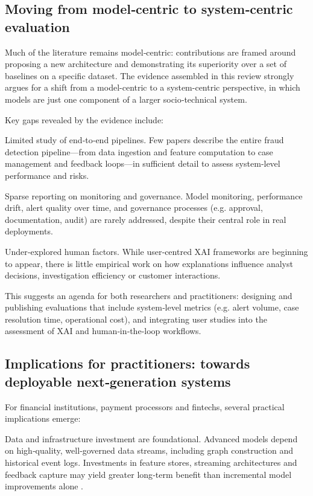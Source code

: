 \documentclass[a4paper,fleqn]{cas-dc}
\begin{document}
\subsection{Moving from model‑centric to system‑centric evaluation}
Much of the literature remains model‑centric: 
contributions are framed around proposing a new architecture and demonstrating its superiority over a set of baselines on a specific dataset. 
The evidence assembled in this review strongly argues for a shift from a model-centric to a system-centric perspective, in which models are just one component of a larger socio‑technical system.

Key gaps revealed by the evidence include: 

Limited study of end‑to‑end pipelines. 
Few papers describe the entire fraud detection pipeline—from data ingestion and feature computation to case management and feedback loops—in sufficient detail to assess system‑level performance and risks.

Sparse reporting on monitoring and governance. 
Model monitoring, performance drift, alert quality over time, and governance processes (e.g. approval, documentation, audit) are rarely addressed, despite their central role in real deployments.

Under‑explored human factors. While user‑centred XAI frameworks are beginning to appear, there is little empirical work on how explanations influence analyst decisions, investigation efficiency or customer interactions.

This suggests an agenda for both researchers and practitioners: designing and publishing evaluations that include system‑level metrics (e.g. alert volume, case resolution time, operational cost), and integrating user studies into the assessment of XAI and human‑in‑the‑loop workflows.

\subsection{Implications for practitioners: towards deployable next‑generation systems}
For financial institutions, payment processors and fintechs, several practical implications emerge:

Data and infrastructure investment are foundational. 
Advanced models depend on high‑quality, well‑governed data streams, including graph construction and historical event logs. 
Investments in feature stores, streaming architectures and feedback capture may yield greater long‑term benefit than incremental model improvements alone \cite{deng_transformer-based_2025, alarfaj_enhancing_2025, ranganatha_enhancing_2025}.
\end{document}
